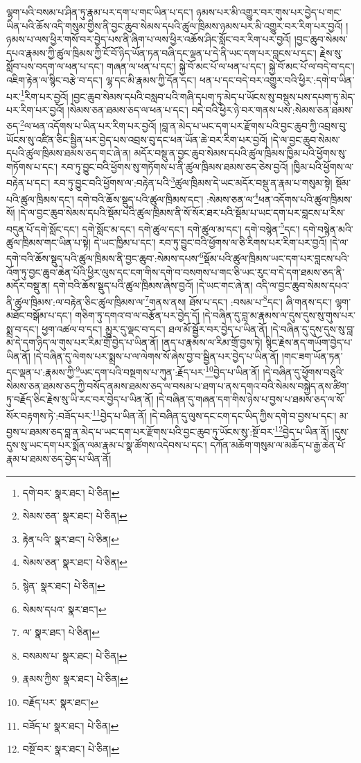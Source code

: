 ལྷག་པའི་བསམ་པ་ཤིན་ཏུ་རྣམ་པར་དག་པ་གང་ཡིན་པ་དང་། ཉམས་པར་མི་འགྱུར་བར་གུས་པར་བྱེད་པ་གང་ཡིན་པའི་ཆོས་འདི་གསུམ་གྱིས་ནི་བྱང་ཆུབ་སེམས་དཔའི་ཚུལ་ཁྲིམས་ཉམས་པར་མི་འགྱུར་བར་རིག་པར་བྱའོ། །
ཉམས་པ་ལས་ཕྱིར་གསོ་བར་བྱེད་པས་ནི་ཞིག་པ་ལས་ཕྱིར་འཆོས་ཤིང་སློང་བར་རིག་པར་བྱའོ། །བྱང་ཆུབ་སེམས་དཔའ་རྣམས་ཀྱི་ཚུལ་ཁྲིམས་ཀྱི་ངོ་བོ་ཉིད་ཡོན་ཏན་བཞི་དང་ལྡན་པ་དེ་ནི་ཡང་དག་པར་བླངས་པ་དང་། རྗེས་སུ་སློབ་པས་བདག་ལ་ཕན་པ་དང་། གཞན་ལ་ཕན་པ་དང་། སྐྱེ་བོ་མང་པོ་ལ་ཕན་པ་དང་། སྐྱེ་བོ་མང་པོ་ལ་བདེ་བ་དང་། འཇིག་རྟེན་ལ་སྙིང་བརྩེ་བ་དང་། ལྷ་དང་མི་རྣམས་ཀྱི་དོན་དང་། ཕན་པ་དང་བདེ་བར་འགྱུར་བའི་ཕྱིར་:དགེ་བ་ཡིན་པར་\footnote{དགེ་བར་  སྣར་ཐང་།  པེ་ཅིན། }རིག་པར་བྱའོ། །བྱང་ཆུབ་སེམས་དཔའི་བསླབ་པའི་གཞི་དཔག་ཏུ་མེད་པ་ཡོངས་སུ་བསྡུས་པས་དཔག་ཏུ་མེད་པར་རིག་པར་བྱའོ། །སེམས་ཅན་ཐམས་ཅད་ལ་ཕན་པ་དང་། བདེ་བའི་ཕྱིར་ཉེ་བར་གནས་པས་:སེམས་ཅན་ཐམས་ཅད་\footnote{སེམས་ཅན་  སྣར་ཐང་།  པེ་ཅིན། }ལ་ཕན་འདོགས་པ་ཡིན་པར་རིག་པར་བྱའོ། །བླ་ན་མེད་པ་ཡང་དག་པར་རྫོགས་པའི་བྱང་ཆུབ་ཀྱི་འབྲས་བུ་ཡོངས་སུ་འཛིན་ཅིང་སྦྱིན་པར་བྱེད་པས་འབྲས་བུ་དང་ཕན་ཡོན་ཆེ་བར་རིག་པར་བྱའོ། །དེ་ལ་བྱང་ཆུབ་སེམས་དཔའི་ཚུལ་ཁྲིམས་ཐམས་ཅད་གང་ཞེ་ན། མདོར་བསྡུ་ན་བྱང་ཆུབ་སེམས་དཔའི་ཚུལ་ཁྲིམས་ཁྱིམ་པའི་ཕྱོགས་སུ་གཏོགས་པ་དང་། རབ་ཏུ་བྱུང་བའི་ཕྱོགས་སུ་གཏོགས་པ་ནི་ཚུལ་ཁྲིམས་ཐམས་ཅད་ཅེས་བྱའོ། །ཁྱིམ་པའི་ཕྱོགས་ལ་བརྟེན་པ་དང་། རབ་ཏུ་བྱུང་བའི་ཕྱོགས་ལ་:བརྟེན་པའི་\footnote{རྟེན་པའི་  སྣར་ཐང་།  པེ་ཅིན། }ཚུལ་ཁྲིམས་དེ་ཡང་མདོར་བསྡུ་ན་རྣམ་པ་གསུམ་སྟེ། སྡོམ་པའི་ཚུལ་ཁྲིམས་དང་། དགེ་བའི་ཆོས་སྡུད་པའི་ཚུལ་ཁྲིམས་དང་། :སེམས་ཅན་ལ་\footnote{སེམས་ཅན་  སྣར་ཐང་།  པེ་ཅིན། }ཕན་འདོགས་པའི་ཚུལ་ཁྲིམས་སོ། །དེ་ལ་བྱང་ཆུབ་སེམས་དཔའི་སྡོམ་པའི་ཚུལ་ཁྲིམས་ནི་སོ་སོར་ཐར་པའི་སྡོམ་པ་ཡང་དག་པར་བླངས་པ་རིས་བདུན་པོ་དགེ་སློང་དང་། དགེ་སློང་མ་དང་། དགེ་ཚུལ་དང་། དགེ་ཚུལ་མ་དང་། དགེ་བསྙེན་\footnote{སྙེན་  སྣར་ཐང་།  པེ་ཅིན། }དང་། དགེ་བསྙེན་མའི་ཚུལ་ཁྲིམས་གང་ཡིན་པ་སྟེ། དེ་ཡང་ཁྱིམ་པ་དང་། རབ་ཏུ་བྱུང་བའི་ཕྱོགས་ལ་ཅི་རིགས་པར་རིག་པར་བྱའོ། །དེ་ལ་དགེ་བའི་ཆོས་སྡུད་པའི་ཚུལ་ཁྲིམས་ནི་བྱང་ཆུབ་:སེམས་དཔས་\footnote{སེམས་དཔའ་  སྣར་ཐང་། }སྡོམ་པའི་ཚུལ་ཁྲིམས་ཡང་དག་པར་བླངས་པའི་འོག་ཏུ་བྱང་ཆུབ་ཆེན་པོའི་ཕྱིར་ལུས་དང་ངག་གིས་དགེ་བ་བསགས་པ་གང་ཅི་ཡང་རུང་བ་དེ་དག་ཐམས་ཅད་ནི་མདོར་བསྡུ་ན། དགེ་བའི་ཆོས་སྡུད་པའི་ཚུལ་ཁྲིམས་ཞེས་བྱའོ། །དེ་ཡང་གང་ཞེ་ན། འདི་ལ་བྱང་ཆུབ་སེམས་དཔའ་ནི་ཚུལ་ཁྲིམས་:ལ་བརྟེན་ཅིང་ཚུལ་ཁྲིམས་ལ་\footnote{ལ་  སྣར་ཐང་།  པེ་ཅིན། }གནས་ནས། ཐོས་པ་དང་། :བསམ་པ་\footnote{བསམས་པ་  སྣར་ཐང་།  པེ་ཅིན། }དང་། ཞི་གནས་དང་། ལྷག་མཐོང་བསྒོམ་པ་དང་། གཅིག་ཏུ་དགའ་བ་ལ་བརྩོན་པར་བྱེད་དོ། །དེ་བཞིན་དུ་བླ་མ་རྣམས་ལ་དུས་དུས་སུ་གུས་པར་སྨྲ་བ་དང་། ཕྱག་འཚལ་བ་དང་། མྱུར་དུ་ལྡང་བ་དང་། ཐལ་མོ་སྦྱོར་བར་བྱེད་པ་ཡིན་ནོ། །དེ་བཞིན་དུ་དུས་དུས་སུ་བླ་མ་དེ་དག་ཉིད་ལ་གུས་པར་རིམ་གྲོ་བྱེད་པ་ཡིན་ནོ། །ནད་པ་རྣམས་ལ་རིམ་གྲོ་བྱས་ཏེ། སྙིང་རྗེས་ནད་གཡོག་བྱེད་པ་ཡིན་ནོ། །དེ་བཞིན་དུ་ལེགས་པར་སྨྲས་པ་ལ་ལེགས་སོ་ཞེས་བྱ་བ་སྦྱིན་པར་བྱེད་པ་ཡིན་ནོ། །གང་ཟག་ཡོན་ཏན་དང་ལྡན་པ་:རྣམས་ཀྱི་\footnote{རྣམས་ཀྱིས་  སྣར་ཐང་།  པེ་ཅིན། }ཡང་དག་པའི་བསྔགས་པ་ཀུན་:རྗོད་པར་\footnote{བརྗོད་པར་  སྣར་ཐང་། }བྱེད་པ་ཡིན་ནོ། །དེ་བཞིན་དུ་ཕྱོགས་བཅུའི་སེམས་ཅན་ཐམས་ཅད་ཀྱི་བསོད་ནམས་ཐམས་ཅད་ལ་བསམ་པ་ཐག་པ་ནས་དགའ་བའི་སེམས་བསྐྱེད་ནས་ཚིག་ཏུ་བརྗོད་ཅིང་རྗེས་སུ་ཡི་རང་བར་བྱེད་པ་ཡིན་ནོ། །དེ་བཞིན་དུ་གཞན་དག་གིས་ཉེས་པ་བྱས་པ་ཐམས་ཅད་ལ་སོ་སོར་བརྟགས་ཏེ་:བཟོད་པར་\footnote{བཟོད་པ་  སྣར་ཐང་།  པེ་ཅིན། }བྱེད་པ་ཡིན་ནོ། །དེ་བཞིན་དུ་ལུས་དང་ངག་དང་ཡིད་ཀྱིས་དགེ་བ་བྱས་པ་དང་། མ་བྱས་པ་ཐམས་ཅད་བླ་ན་མེད་པ་ཡང་དག་པར་རྫོགས་པའི་བྱང་ཆུབ་ཏུ་ཡོངས་སུ་:སྔོ་བར་\footnote{བསྔོ་བར་  སྣར་ཐང་།  པེ་ཅིན། }བྱེད་པ་ཡིན་ནོ། །དུས་དུས་སུ་ཡང་དག་པར་སྨོན་ལམ་རྣམ་པ་སྣ་ཚོགས་འདེབས་པ་དང་། དཀོན་མཆོག་གསུམ་ལ་མཆོད་པ་རྒྱ་ཆེན་པོ་རྣམ་པ་ཐམས་ཅད་བྱེད་པ་ཡིན་ནོ། 